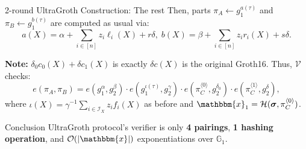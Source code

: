 \documentclass{zkdl-presentation-template}
\begin{document}
    \begin{frame}{2-round UltraGroth Construction: The rest}
        Then, parts $\pi_A \gets g_1^{a(\tau)}$ and $\pi_B \gets g_1^{b(\tau)}$ are computed as usual via:
        \begin{equation*}
            a(X) = \alpha + \sum_{i \in [n]}z_i\ell_i(X) + r\delta, \; b(X) = \beta + \sum_{i \in [n]}z_ir_i(X) + s\delta.
        \end{equation*}

        \textbf{Note:} $\delta_0c_0(X) + \delta c_1(X)$ is exactly $\delta c(X)$ is the original Groth16. 
        Thus, $\mathcal{V}$ checks:
        \begin{equation*}
            e(\pi_A,\pi_B) = e(g_1^{\alpha},g_2^{\beta}) \cdot e(g_1^{\iota(\tau)},g_2^{\gamma}) \cdot e(\pi_C^{\langle 0 \rangle}, g_2^{\delta_0}) \cdot e(\pi_C^{\langle 1 \rangle}, g_2^{\delta}),
        \end{equation*}
        where $\iota(X) = \gamma^{-1}\sum_{i \in \mathcal{I}_X}z_if_i(X)$ as before
        and $\mathbbm{x}_1 = \mathcal{H}(\boldsymbol{\sigma}, \pi_C^{\langle 0
        \rangle})$.

        \begin{alertblock}{Conclusion}
            UltraGroth protocol's verifier is only \textbf{4 pairings},
            \textbf{1 hashing operation}, and $\mathcal{O}(|\mathbbm{x}|)$
            exponentiations over $\mathbb{G}_1$.
        \end{alertblock}
    \end{frame}
\end{document}
